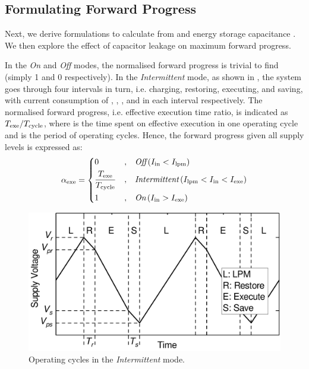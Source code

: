 \subsection{Formulating Forward Progress} \label{subsec:formulation}

Next, we derive formulations to calculate  from  and energy storage capacitance . 
We then explore the effect of capacitor leakage on maximum forward progress. 

In the \textit{On} and \textit{Off} modes, the normalised forward progress is trivial to find (simply 1 and 0 respectively). 
In the \textit{Intermittent} mode,  as shown in , the system goes through four intervals in turn, i.e. charging, restoring, executing, and saving, with current consumption of , , , and  in each interval respectively. 
The normalised forward progress, i.e. effective execution time ratio, is indicated as $T_{\text{exe}} / T_{\text{cycle}}$, where  is the time spent on effective execution in one operating cycle and  is the period of operating cycles. 
Hence, the forward progress given all supply levels is expressed as:
\begin{equation}
    \alpha_{\text{exe}} = \left\{
    \begin{aligned}
        & 0 & , & \quad \textit{Off} \, (I_{\text{in}} < I_{\text{lpm}}) \\
        & \frac{T_{\text{exe}}}{T_{\text{cycle}}} & , & \quad \textit{Intermittent} \, (I_{\text{lpm}} < I_{\text{in}} < I_{\text{exe}}) \\
        & 1 & , & \quad \textit{On} \, (I_{\text{in}} > I_{\text{exe}})
    \end{aligned}
    \right.
    \label{eq:feff}
\end{equation}

\begin{figure}
    \centering
    \includegraphics[width=\columnwidth]{ch3_sizingeffect/figures/CRESdemoFig}
    \caption{Operating cycles in the \textit{Intermittent} mode. }
    \label{fig:operatingCycle}
\end{figure}

